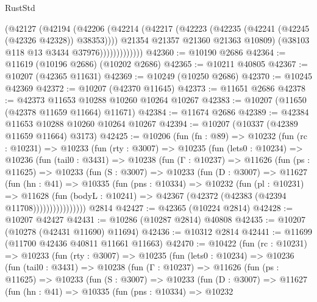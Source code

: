 \begin{lexlean}{RustStd}
\begin{coremodule}
                      (@42127
                        (@42194
                          (@42206
                            (@42214
                              (@42217 (@42223 (@42235 (@42241 (@42245 (@42326 @42328)) @38353))))
                              @21354
                              @21357
                              @21360
                              @21363
                              @10809)
                            (@38103 @118 @13 @3434 @37976)))))))))))))
@42360 := @10190 @2686
@42364 := @11619 (@10196 @2686) (@10202 @2686)
@42365 := @10211 @40805
@42367 := @10207 (@42365 @11631)
@42369 := @10249 (@10250 @2686)
@42370 := @10245 @42369
@42372 := @10207 (@42370 @11645)
@42373 := @11651 @2686
@42378 := @42373 @11653 @10288 @10260 @10264 @10267
@42383 := @10207 (@11650 (@42378 @11659 @11664) @11671)
@42384 := @11674 @2686
@42389 := @42384 @11653 @10288 @10260 @10264 @10267
@42394 := @10207 (@10337 (@42389 @11659 @11664) @3173)
@42425 := @10206
    (fun (fn : @89) =>
    @10232
      (fun (rc : @10231) =>
      @10233
        (fun (rty : @3007) =>
        @10235
          (fun (lets0 : @10234) =>
          @10236
            (fun (tail0 : @3431) =>
            @10238
              (fun (Γ : @10237) =>
              @11626
                (fun (ps : @11625) =>
                @10233
                  (fun (S : @3007) =>
                  @10233
                    (fun (D : @3007) =>
                    @11627
                      (fun (hn : @41) =>
                      @10335
                        (fun (pns : @10334) =>
                        @10232
                          (fun (pl : @10231) =>
                          @11628
                            (fun (bodyL : @10241) =>
                            @42367 (@42372 (@42383 (@42394 @11708))))))))))))))))
    @2814
@42427 := @42365 (@10224 @2814)
@42428 := @10207 @42427
@42431 := @10286 (@10287 @2814) @40808
@42435 := @10207 (@10278 (@42431 @11690) @11694)
@42436 := @10312 @2814
@42441 := @11699 (@11700 @42436 @40811 @11661 @11663)
@42470 := @10422
    (fun (rc : @10231) =>
    @10233
      (fun (rty : @3007) =>
      @10235
        (fun (lets0 : @10234) =>
        @10236
          (fun (tail0 : @3431) =>
          @10238
            (fun (Γ : @10237) =>
            @11626
              (fun (ps : @11625) =>
              @10233
                (fun (S : @3007) =>
                @10233
                  (fun (D : @3007) =>
                  @11627
                    (fun (hn : @41) =>
                    @10335
                      (fun (pns : @10334) =>
                      @10232

\end{coremodule}
\end{lexlean}
